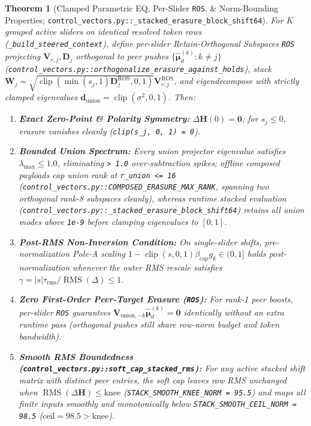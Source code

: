 \documentclass[10pt]{article}
\newtheorem{theorem}{Theorem}
\begin{document}
\begin{theorem}[Clamped Parametric EQ, Per-Slider \texttt{ROS}, \& Norm-Bounding Properties; \texttt{control\_vectors.py::\_stacked\_erasure\_block\_shift64}]
For $K$ grouped active sliders on identical resolved token rows (\texttt{\_build\_steered\_context}), define per-slider Retain-Orthogonal Subspaces \texttt{ROS} projecting $\mathbf{V}_{r,j}, \mathbf{D}_j$ orthogonal to peer pushes $\{\hat{\boldsymbol{\mu}}_d^{(k)} : k \ne j\}$ (\texttt{control\_vectors.py::orthogonalize\_erasure\_against\_holds}), stack $\mathbf{W}_j = \sqrt{\operatorname{clip}(\min(s_j,1)\mathbf{D}_j^{\text{ROS}}, 0, 1)}\mathbf{V}_{r,j}^{\text{ROS}}$, and eigendecompose with strictly clamped eigenvalues $\mathbf{d}_{\text{union}} = \operatorname{clip}(\sigma^2, 0, 1)$. Then:
\begin{enumerate}[leftmargin=*]
\item \textbf{Exact Zero-Point \& Polarity Symmetry:} $\Delta\mathbf{H}(0) = \mathbf{0}$; for $s_j \le 0$, erasure vanishes cleanly (\texttt{clip(s\_j, 0, 1) = 0}).
\item \textbf{Bounded Union Spectrum:} Every union projector eigenvalue satisfies $\lambda_{\max} \le 1.0$, eliminating \texttt{> 1.0} over-subtraction spikes; offline composed payloads cap union rank at \texttt{r\_union <= 16} (\texttt{control\_vectors.py::COMPOSED\_ERASURE\_MAX\_RANK}, spanning two orthogonal rank-8 subspaces cleanly), whereas runtime stacked evaluation (\texttt{control\_vectors.py::\_stacked\_erasure\_block\_shift64}) retains all union modes above \texttt{1e-9} before clamping eigenvalues to $[0, 1]$.
\item \textbf{Post-RMS Non-Inversion Condition:} On single-slider shifts, pre-normalization Pole-A scaling $1 - \operatorname{clip}(s,0,1)\beta_{\text{cap}}g_k \in (0, 1]$ holds post-normalization whenever the outer RMS rescale satisfies $\gamma = |s|\tau_{\text{rms}} / \operatorname{RMS}(\Delta) \le 1$.
\item \textbf{Zero First-Order Peer-Target Erasure (\texttt{ROS}):} For rank-1 peer boosts, per-slider \texttt{ROS} guarantees $\mathbf{V}_{\text{union},-k}\hat{\boldsymbol{\mu}}_d^{(k)} = \mathbf{0}$ identically without an extra runtime pass (orthogonal pushes still share row-norm budget and token bandwidth).
\item \textbf{Smooth RMS Boundedness (\texttt{control\_vectors.py::soft\_cap\_stacked\_rms}):} For any active stacked shift matrix with distinct peer entries, the soft cap leaves row RMS unchanged when $\operatorname{RMS}(\Delta\mathbf{H}) \le \text{knee}$ (\texttt{STACK\_SMOOTH\_KNEE\_NORM = 95.5}) and maps all finite inputs smoothly and monotonically below \texttt{STACK\_SMOOTH\_CEIL\_NORM = 98.5} ($\text{ceil} = 98.5 > \text{knee}$).
\end{enumerate}
\end{theorem}
\end{document}
